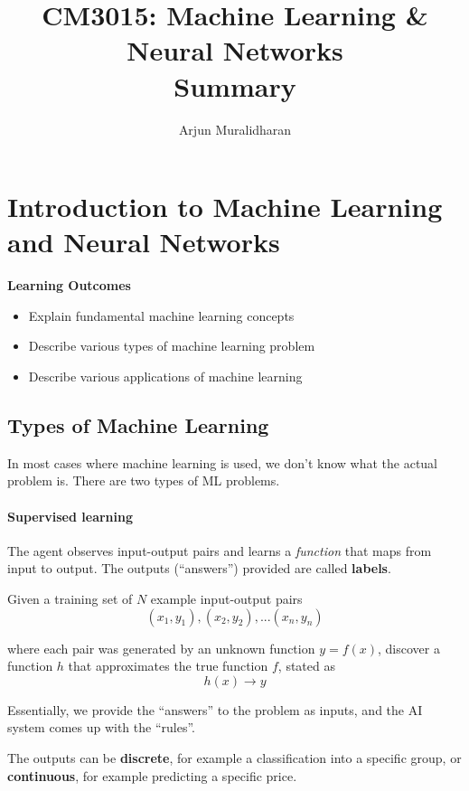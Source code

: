 \title{CM3015: Machine Learning & Neural Networks \\ Summary}
\author{Arjun Muralidharan}



\section{Introduction to Machine Learning and Neural Networks}
\begin{mdframed}
\textbf{Learning Outcomes}
\begin{itemize}[label={\checkmark}]
\item Explain fundamental machine learning concepts
\item Describe various types of machine learning problem
\item Describe various applications of machine learning
\end{itemize}
\end{mdframed}

\subsection{Types of Machine Learning}

In most cases where machine learning is used, we don't know what the actual problem is. There are two types of ML problems.

\paragraph{Supervised learning} The agent observes input-output pairs and learns a \textit{function} that maps from input to output. The outputs (``answers'') provided are called \textbf{labels}.

Given a training set of \(N\) example input-output pairs
\[
(x_1, y_1),(x_2, y_2),...(x_n, y_n)
\]

where each pair was generated by an unknown function \(y = f(x)\), discover a function \(h\) that approximates the true function \(f\), stated as 
\[
h(x) \rightarrow y    
\]


Essentially, we provide the ``answers'' to the problem as inputs, and the AI system comes up with the ``rules''.

The outputs can be \textbf{discrete}, for example a classification into a specific group, or \textbf{continuous}, for example predicting a specific price.

